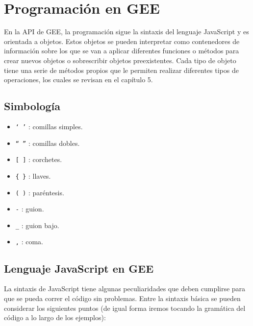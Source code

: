 \documentclass[
  12pt,
  letterpaper,
  twoside]{book}
\providecommand{\tightlist}{%
  \setlength{\itemsep}{0pt}\setlength{\parskip}{0pt}}
\begin{document}
\hypertarget{programaciuxf3n-en-gee}{%
\section{Programación en GEE}\label{programaciuxf3n-en-gee}}

En la API de GEE, la programación sigue la sintaxis del lenguaje JavaScript y es orientada a objetos. Estos objetos se pueden interpretar como contenedores de información sobre los que se van a aplicar diferentes funciones o métodos para crear nuevos objetos o sobrescribir objetos preexistentes. Cada tipo de objeto tiene una serie de métodos propios que le permiten realizar diferentes tipos de operaciones, los cuales se revisan en el capítulo 5.

\hypertarget{simbologuxeda}{%
\subsection*{Simbología}\label{simbologuxeda}}

\begin{itemize}
\tightlist
\item
  \texttt{‘\ ’} : comillas simples.
\item
  \texttt{“\ ”} : comillas dobles.
\item
  \texttt{{[}\ {]}} : corchetes.
\item
  \texttt{\{\ \}} : llaves.
\item
  \texttt{(\ )} : paréntesis.
\item
  \texttt{-} : guion.
\item
  \texttt{\_} : guion bajo.
\item
  \texttt{,} : coma.
\end{itemize}

\hypertarget{lenguaje-javascript-en-gee}{%
\subsection*{Lenguaje JavaScript en GEE}\label{lenguaje-javascript-en-gee}}

La sintaxis de JavaScript tiene algunas peculiaridades que deben cumplirse para que se pueda correr el código sin problemas. Entre la sintaxis básica se pueden considerar los siguientes puntos (de igual forma iremos tocando la gramática del código a lo largo de los ejemplos):
\end{document}
